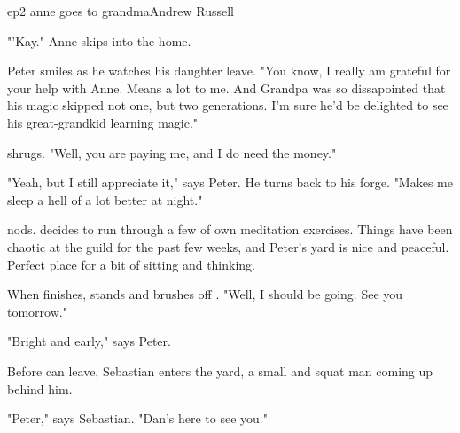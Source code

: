 \documentclass{book}
\begin{document}
\begin{childnode}{ep2 anne goes to grandma}{Andrew Russell}

    "'Kay." Anne skips into the home.

    Peter smiles as he watches his daughter leave. "You know, I really am grateful for your help with Anne. Means a lot to me. And Grandpa was so dissapointed that his magic skipped not one, but two generations. I'm sure he'd be delighted to see his 
    great-grandkid learning magic."

    \name{} shrugs. "Well, you are paying me, and I do need the money."

    "Yeah, but I still appreciate it," says Peter. He turns back to his forge. "Makes me sleep a hell of a lot better at night."

    \name{} nods. \HeShe{} decides to run through a few of \hisher{} own meditation exercises. Things have been chaotic at the guild for the past few weeks, and Peter's yard is nice and peaceful. 
    Perfect place for a bit of sitting and thinking.

    When \heshe{} finishes, \name{} stands and brushes off \hisher{} \trousers{}. "Well, I should be going. See you tomorrow."

    "Bright and early," says Peter.

    Before \name{} can leave, Sebastian enters the yard, a small and squat man coming up behind him.

    "Peter," says Sebastian. "Dan's here to see you."


\end{childnode}



\end{document}
